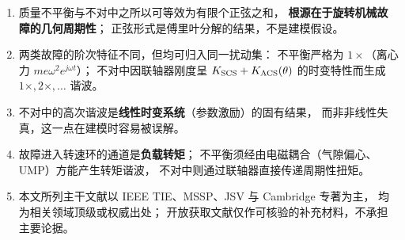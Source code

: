 \documentclass[11pt,a4paper]{ctexart}
\begin{document}
\begin{enumerate}[label=(\arabic*)]
\item 质量不平衡与不对中之所以可等效为有限个正弦之和，
\textbf{根源在于旋转机械故障的几何周期性}；
正弦形式是傅里叶分解的结果，不是建模假设。

\item 两类故障的阶次特征不同，但均可归入同一扰动集：
不平衡严格为 $1\times$（离心力 $me\omega^2e^{j\omega t}$）；
不对中因联轴器刚度呈 $K_{\rm SCS}+K_{\rm ACS}(\theta)$ 的时变特性而生成 $1\times,2\times,\dots$ 谐波。

\item 不对中的高次谐波是\textbf{线性时变系统}（参数激励）的固有结果，
而非非线性失真，这一点在建模时容易被误解。

\item 故障进入转速环的通道是\textbf{负载转矩}；
不平衡须经由电磁耦合（气隙偏心、UMP）方能产生转矩谐波，
不对中则通过联轴器直接传递周期性扭矩。

\item 本文所列主干文献以 IEEE TIE、MSSP、JSV 与 Cambridge 专著为主，
均为相关领域顶级或权威出处；
开放获取文献仅作可核验的补充材料，不承担主要论据。
\end{enumerate}
\end{document}
